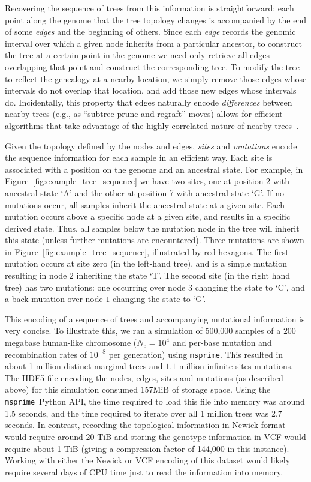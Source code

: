 \documentclass{article}
\newcommand{\msprime}{\texttt{msprime}}
\begin{document}
Recovering the sequence of trees from this information is straightforward:
each point along the genome that the tree topology changes
is accompanied by the end of some \emph{edges} and the beginning of others.
Since each \emph{edge} records the genomic interval
over which a given node inherits from a particular ancestor,
to construct the tree at a certain point in the genome
we need only retrieve all edges overlapping that point
and construct the corresponding tree.
To modify the tree to reflect the genealogy at a nearby location,
we simply remove those edges whose intervals do not overlap that location,
and add those new edges whose intervals do.
Incidentally, this property that edges naturally encode \emph{differences}
between nearby trees (e.g., as ``subtree prune and regraft'' moves)
allows for efficient algorithms that take advantage
of the highly correlated nature of nearby trees~\citep{kelleher2016efficient}.

Given the topology defined by the nodes and edges, \emph{sites} and \emph{mutations}
encode the sequence information for each sample in an efficient way. Each site
is associated with a position on the genome and an ancestral state. For example,
in Figure~\ref{fig:example_tree_sequence} we have two sites, one at position
2 with ancestral state `A' and the other at position 7 with ancestral state `G'. If
no mutations occur, all samples inherit the ancestral state at a given site.
Each mutation occurs above a specific node at a given site,
and results in a specific derived state.
Thus, all samples below the mutation node in the tree will inherit this state
(unless further mutations are encountered).
Three mutations are shown in Figure~\ref{fig:example_tree_sequence},
illustrated by red hexagons.
The first mutation occurs at site zero (in the left-hand tree), and is a simple
mutation resulting in node $2$ inheriting the state `T'.
The second site (in the right hand tree) has two mutations:
one occurring over node $3$ changing the state to `C',
and a back mutation over node $1$ changing the state to `G'.

This encoding of a sequence of trees and accompanying mutational information is
very concise. To illustrate this, we ran a simulation of 500,000 samples of a
$200$ megabase human-like chromosome ($N_e=10^4$ and per-base mutation and
recombination rates of $10^{-8}$ per generation) using \msprime. This resulted
in about 1 million distinct marginal trees and $1.1$ million infinite-sites
mutations. The HDF5 file encoding the nodes, edges, sites and mutations (as
described above) for this simulation consumed 157MiB of storage space. Using
the \msprime\ Python API, the time required to load this file into memory was
around 1.5 seconds, and the time required to iterate over all 1 million trees
was 2.7 seconds. In contrast, recording the topological information in Newick
format would require around 20 TiB and storing the genotype information
in VCF would require about 1 TiB (giving a compression factor of 144,000 in
this instance).
Working with either the Newick or VCF encoding
of this dataset would likely require several
days of CPU time just to read the information into memory.
\end{document}
